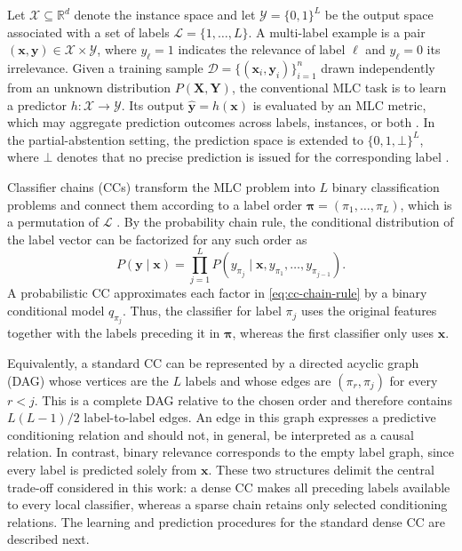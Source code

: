 \documentclass[a4paper,fleqn]{cas-sc}
\begin{document}
Let $\mathcal{X}\subseteq\mathbb{R}^{d}$ denote the instance space and let
$\mathcal{Y}=\{0,1\}^{L}$ be the output space associated with a set of labels
$\mathcal{L}=\{1,\ldots,L\}$. A multi-label example is a pair
$(\boldsymbol{x},\boldsymbol{y})\in\mathcal{X}\times\mathcal{Y}$, where
$y_{\ell}=1$ indicates the relevance of label $\ell$ and $y_{\ell}=0$ its
irrelevance. Given a training sample
$\mathcal{D}=\{(\boldsymbol{x}_{i},\boldsymbol{y}_{i})\}_{i=1}^{n}$ drawn
independently from an unknown distribution $P(\boldsymbol{X},\boldsymbol{Y})$,
the conventional MLC task is to learn a predictor
$h:\mathcal{X}\rightarrow\mathcal{Y}$. Its output
$\widehat{\boldsymbol{y}}=h(\boldsymbol{x})$ is evaluated by an MLC metric,
which may aggregate prediction outcomes across labels, instances, or both
\citep{dembczynski2012label,zhang2013review}. In the partial-abstention setting,
the prediction space is extended to $\{0,1,\bot\}^{L}$, where $\bot$ denotes
that no precise prediction is issued for the corresponding label
\citep{nguyen2021multilabel}.

Classifier chains (CCs) transform the MLC problem into $L$ binary
classification problems and connect them according to a label order
$\boldsymbol{\pi}=(\pi_{1},\ldots,\pi_{L})$, which is a permutation of
$\mathcal{L}$ \citep{read2011classifier,read2021classifier}. By the probability
chain rule, the conditional distribution of the label vector can be factorized
for any such order as
\begin{equation}
P(\boldsymbol{y}\mid\boldsymbol{x})
=\prod_{j=1}^{L}
P\!\left(y_{\pi_{j}}\mid
\boldsymbol{x},y_{\pi_{1}},\ldots,y_{\pi_{j-1}}\right).
\label{eq:cc-chain-rule}
\end{equation}
A probabilistic CC approximates each factor in \cref{eq:cc-chain-rule} by a
binary conditional model $q_{\pi_j}$. Thus, the classifier for label $\pi_j$
uses the original features together with the labels preceding it in
$\boldsymbol{\pi}$, whereas the first classifier only uses
$\boldsymbol{x}$.

Equivalently, a standard CC can be represented by a directed acyclic graph
(DAG) whose vertices are the $L$ labels and whose edges are
$(\pi_r,\pi_j)$ for every $r<j$. This is a complete DAG relative to the chosen
order and therefore contains $L(L-1)/2$ label-to-label edges. An edge in this
graph expresses a predictive conditioning relation and should not, in general,
be interpreted as a causal relation. In contrast, binary relevance corresponds
to the empty label graph, since every label is predicted solely from
$\boldsymbol{x}$. These two structures delimit the central trade-off considered
in this work: a dense CC makes all preceding labels available to every local
classifier, whereas a sparse chain retains only selected conditioning
relations. The learning and prediction procedures for the standard dense CC
are described next.
\end{document}
